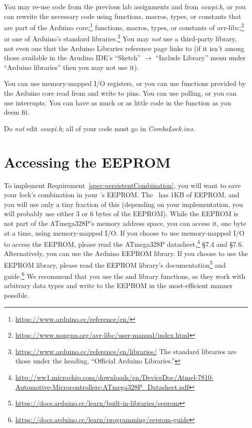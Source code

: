 You may re-use code from the previous lab assignments and from \textit{cowpi.h},
or you can rewrite the necessary code using functions, macros, types, or
constants that are part of the Arduino
core;\footnote{\url{https://www.arduino.cc/reference/en/}} functions, macros,
types, or constants of
avr-libc;\footnote{\url{https://www.nongnu.org/avr-libc/user-manual/index.html}}
or one of Arduino's standard
libraries.\footnote{\url{https://www.arduino.cc/reference/en/libraries/} The
standard libraries are those under the heading, ``Official Arduino Libraries.''}
You may \textit{not} use a third-party library, not even one that the Arduino
Libraries reference page links to (if it isn't among those available in the
Arudino IDE's ``Sketch'' $\rightarrow$ ``Include Library'' menu under ``Arduino
libraries'' then you may not use it).

You can use memory-mapped I/O registers, or you can use functions provided by
the Arduino core read from and write to pins. You can use polling, or you can
use interrupts. You can have as much or as little code in the 
function as you deem fit.

Do \textit{not} edit \textit{cowpi.h}; all of your code must go in
\textit{ComboLock.ino}.

\section{Accessing the EEPROM} \label{sec:AccessingEEProm}

To implement Requirement~\ref{spec:persistentCombination}, you will want to save
your lock's combination in your \nano's EEPROM. The \nano\ has 1KB of EEPROM,
and you will use only a tiny fraction of this (depending on your implementation,
you will probably use either 3 or 6 bytes of the EEPROM). While the EEPROM is
not part of the ATmega328P's memory address space, you can access it, one byte
at a time, using memory-mapped I/O. If you choose to use memory-mapped I/O to access the EEPROM, please read the ATmega328P
datasheet,\footnote{\url{http://ww1.microchip.com/downloads/en/DeviceDoc/Atmel-7810-Automotive-Microcontrollers-ATmega328P_Datasheet.pdf}}
§7.4 and §7.6. Alternatively, you can use the Arduino EEPROM library. If you
choose to use the EEPROM library, please read the EEPROM library's
documentation\footnote{\url{https://docs.arduino.cc/learn/built-in-libraries/eeprom}}
and guide.\footnote{\url{https://docs.arduino.cc/learn/programming/eeprom-guide}}
We recommend that you use the  and
 library functions, as they work with arbitrary data
types and write to the EEPROM in the most-efficient manner possible.

